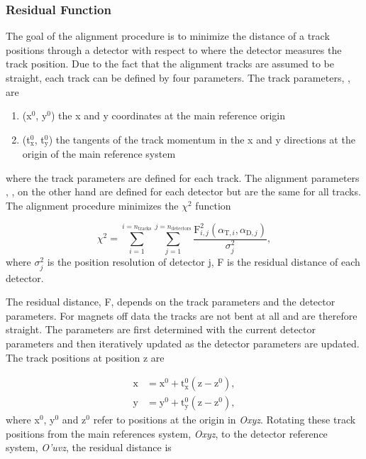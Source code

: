 \subsubsection{Residual Function}

The goal of the alignment procedure is to minimize the distance of a track
positions through a detector with respect to where the detector measures the
track position.  Due to the fact that the alignment tracks are assumed to be
straight, each track can be defined by four parameters.  The track parameters,
{\atrack}, are

\begin{enumerate}[label=\roman*:]
\item (x$^0$, y$^0$) the x and y coordinates at the main reference origin
\item (t$_{\mathrm{x}}^0$, t$_{\mathrm{y}}^0$) the tangents of the track
  momentum in the x and y directions at the origin of the main reference system
\end{enumerate}
\noindent
where the track parameters are defined for each track.  The alignment parameters
, {\adet}, on the other hand are defined for each detector but are the same for
all tracks.  The alignment procedure minimizes the $\chi^2$ function

\begin{equation}
  \chi^2 =
  \sum_{i=1}^{i=n_{\mathrm{tracks}}}\sum_{j=1}^{j=n_{\mathrm{detectors}}}
  \frac{\mathrm{F}^2_{i,j}(\alpha_{\mathrm{T}, i}, \alpha_{\mathrm{D},
      j})}{\sigma_j^2},
  \label{equ::chi_align}%
\end{equation}
\noindent
where $\sigma^2_j$ is the position resolution of detector j, F is the residual
distance of each detector.

The residual distance, F, depends on the track parameters and the detector
parameters.  For magnets off data the tracks are not bent at all and are
therefore straight.  The parameters are first determined with the current
detector parameters and then iteratively updated as the detector parameters are
updated.  The track positions at position z are 

\begin{align}
  \label{equ::trackPosOff}
  \mathrm{x} &= \mathrm{x}^0 +
  \mathrm{t}_{\mathrm{x}}^0(\mathrm{z}-\mathrm{z}^0), \\
  \mathrm{y} &=
  \mathrm{y}^0 + \mathrm{t}_{\mathrm{y}}^0(\mathrm{z}-\mathrm{z}^0),
\end{align}
\noindent
where x$^0$, y$^0$ and z$^0$ refer to positions at the origin in \textit{Oxyz}.
Rotating these track positions from the main references system, \textit{Oxyz},
to the detector reference system, \textit{O'uvz}, the residual distance is

